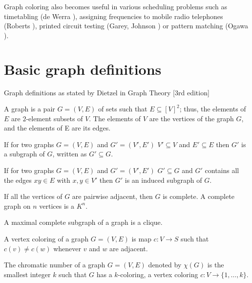 Graph coloring also becomes useful in various scheduling problems such as timetabling (de Werra \cite{de1985introduction}), assigning frequencies to mobile radio telephones (Roberts \cite{roberts}), printed circuit testing (Garey, Johnson \cite{1084138}) or pattern matching (Ogawa \cite{ogawa1986labeled}).

\section{Basic graph definitions}
Graph definitions as stated by Dietzel in Graph Theory [3rd edition] \cite{diestel2005graph}
\begin{defn}[graph]
	\label{def:graph}
	A graph is a pair $G = (V, E)$ of sets such that $E \subseteq [V]^2$; thus, the elements of $E$ are $2$-element subsets of $V$. The elements of $V$ are the vertices of the graph $G$, and the elements of E are its edges.
\end{defn}
\begin{defn}[subgraph]
	\label{def:subgraph}
	If for two graphs $G = (V,E)$ and $G' = (V', E')$ $V' \subseteq V$ and $E' \subseteq E$ then $G'$ is a subgraph of $G$, written as $G' \subseteq G$.
\end{defn}
\begin{defn}
	\label{def:inducedSubgraph}
	If for two graphs $G = (V,E)$ and $G' = (V', E')$ $G' \subseteq G$ and $G'$ contains all the edges $xy \in E$ with $x,y \in V'$ then $G'$ is an induced subgraph of $G$.
\end{defn}
\begin{defn}
    \label{def:completeGraph}
    If all the vertices of $G$ are pairwise adjacent, then $G$ is complete. A complete graph on $n$ vertices is a $K^n$.
\end{defn}
\begin{defn}[clique]
    \label{def:clique}
    A maximal complete subgraph of a graph is a clique.
\end{defn}
\begin{defn}
	\label{def:coloring}
	A vertex coloring of a graph $G=(V, E)$ is map $c: V\rightarrow S$ such that $c(v) \neq c(w)$ whenever $v$ and $w$ are adjacent.
\end{defn}
\begin{defn}
	\label{def:chromaticNumber}
	The chromatic number of a graph $G=(V, E)$ denoted by $\chi(G)$ is the smallest integer $k$ such that $G$ has a $k$-coloring, a vertex coloring $c: V\rightarrow \{ 1, \dots , k \}$.
\end{defn}

